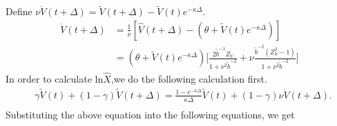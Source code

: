 \documentclass{ws-ijfe}
\begin{document}
Define $\nu \mathring{V}(t+\Delta)=\tilde{V}(t+\Delta)-\tilde{V}(t)e^{-\kappa\Delta}$.\\
\begin{equation*}
\begin{split}
\mathring{V}(t+\Delta)%
&=\frac{1}{\nu}[\hat{V}(t+\Delta)-(\theta+\tilde{V}(t)e^{-\kappa\Delta})]\\
&=(\theta+\tilde{V}(t)e^{-\kappa\Delta})\bigg[\frac{2\tilde{b}^{-1}Z_V}{1+\nu^2\tilde{b}^{-2}}+\nu\frac{\tilde{b}^{-2}(Z_V^2-1)}{1+\nu^2\tilde{b}^{-2}}\bigg]
\end{split}
\end{equation*}
In order to calculate $\text{ln}\hat{X}$,we do the following calculation first.\\
\begin{equation*}
\begin{split}
&\gamma\tilde{V}(t)+(1-\gamma)\tilde{V}(t+\Delta)
=%
\frac{1-e^{-\kappa\Delta}}{\kappa\Delta}\tilde{V}(t)+(1-\gamma)\nu\mathring{V}(t+\Delta).\\
\end{split}
\end{equation*}
Substituting the above equation into the following equations, we get
\end{document}
